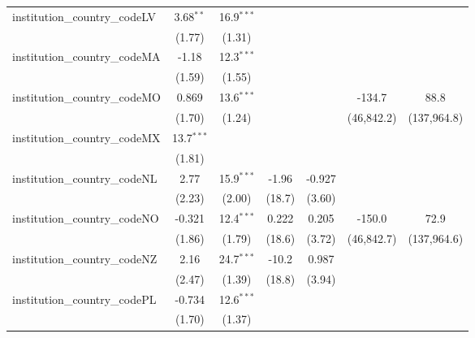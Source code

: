 \begin{tabular}{lcccccc}
   institution\_country\_codeLV          & 3.68$^{**}$   & 16.9$^{***}$  &               &               &              &   \\   
                                         & (1.77)        & (1.31)        &               &               &              &   \\   
   institution\_country\_codeMA          & -1.18         & 12.3$^{***}$  &               &               &              &   \\   
                                         & (1.59)        & (1.55)        &               &               &              &   \\   
   institution\_country\_codeMO          & 0.869         & 13.6$^{***}$  &               &               & -134.7       & 88.8\\   
                                         & (1.70)        & (1.24)        &               &               & (46,842.2)   & (137,964.8)\\   
   institution\_country\_codeMX          & 13.7$^{***}$  &               &               &               &              &   \\   
                                         & (1.81)        &               &               &               &              &   \\   
   institution\_country\_codeNL          & 2.77          & 15.9$^{***}$  & -1.96         & -0.927        &              &   \\   
                                         & (2.23)        & (2.00)        & (18.7)        & (3.60)        &              &   \\   
   institution\_country\_codeNO          & -0.321        & 12.4$^{***}$  & 0.222         & 0.205         & -150.0       & 72.9\\   
                                         & (1.86)        & (1.79)        & (18.6)        & (3.72)        & (46,842.7)   & (137,964.6)\\   
   institution\_country\_codeNZ          & 2.16          & 24.7$^{***}$  & -10.2         & 0.987         &              &   \\   
                                         & (2.47)        & (1.39)        & (18.8)        & (3.94)        &              &   \\   
   institution\_country\_codePL          & -0.734        & 12.6$^{***}$  &               &               &              &   \\   
                                         & (1.70)        & (1.37)        &               &               &              &   \\   

\end{tabular}
